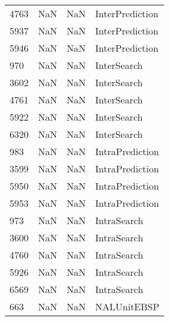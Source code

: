 \begin{tabular}{llll}
4763 &                   NaN &                        NaN &                           InterPrediction \\
5937 &                   NaN &                        NaN &                           InterPrediction \\
5946 &                   NaN &                        NaN &                           InterPrediction \\
970  &                   NaN &                        NaN &                               InterSearch \\
3602 &                   NaN &                        NaN &                               InterSearch \\
4761 &                   NaN &                        NaN &                               InterSearch \\
5922 &                   NaN &                        NaN &                               InterSearch \\
6320 &                   NaN &                        NaN &                               InterSearch \\
983  &                   NaN &                        NaN &                           IntraPrediction \\
3599 &                   NaN &                        NaN &                           IntraPrediction \\
5950 &                   NaN &                        NaN &                           IntraPrediction \\
5953 &                   NaN &                        NaN &                           IntraPrediction \\
973  &                   NaN &                        NaN &                               IntraSearch \\
3600 &                   NaN &                        NaN &                               IntraSearch \\
4760 &                   NaN &                        NaN &                               IntraSearch \\
5926 &                   NaN &                        NaN &                               IntraSearch \\
6569 &                   NaN &                        NaN &                               IntraSearch \\
663  &                   NaN &                        NaN &                               NALUnitEBSP \\

\end{tabular}
